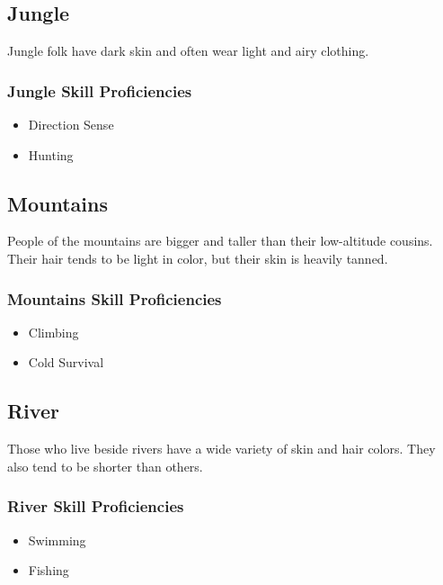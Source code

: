 \begin{multicols}{2}
\subsection{Jungle}

Jungle folk have dark skin and often wear light and airy clothing.

\subsubsection{Jungle Skill Proficiencies}

\begin{itemize}
  \item Direction Sense
  \item Hunting
\end{itemize}

\subsection{Mountains}

People of the mountains are bigger and taller than their low-altitude
cousins. Their hair tends to be light in color, but their skin is heavily
tanned.

\subsubsection{Mountains Skill Proficiencies}

\begin{itemize}
  \item Climbing
  \item Cold Survival
\end{itemize}

\subsection{River}

Those who live beside rivers have a wide variety of skin and hair colors.
They also tend to be shorter than others.

\subsubsection{River Skill Proficiencies}

\begin{itemize}
  \item Swimming
  \item Fishing
\end{itemize}


\end{multicols}
